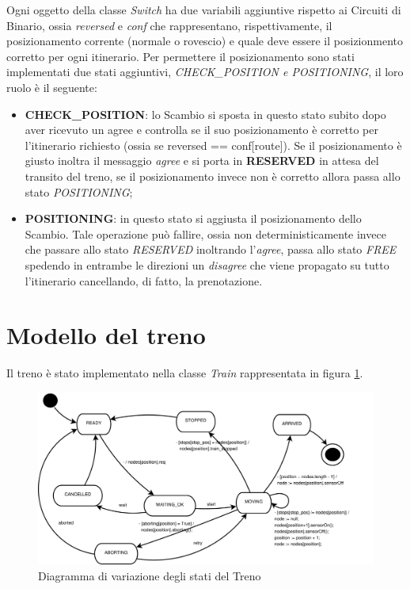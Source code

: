 Ogni oggetto della classe \textit{Switch} ha due variabili aggiuntive rispetto
ai Circuiti di Binario, ossia \textit{reversed} e \textit{conf} che
rappresentano, rispettivamente, il posizionamento corrente (normale o rovescio)
e quale deve essere il posizionmento corretto per ogni itinerario. Per
permettere il posizionamento sono stati implementati due stati aggiuntivi,
\textit{CHECK\_POSITION e POSITIONING}, il loro ruolo è il seguente:
\begin{itemize}
  \item \textbf{CHECK\_POSITION}: lo Scambio si sposta in questo stato subito
  dopo aver ricevuto un agree e controlla se il suo posizionamento è corretto
  per l’itinerario richiesto (ossia se reversed == conf[route]). Se il
  posizionamento è giusto inoltra il messaggio \textit{agree} e si porta in
  \textbf{RESERVED} in attesa del transito del treno, se il posizionamento
  invece non è corretto allora passa allo stato \textit{POSITIONING};
  \item \textbf{POSITIONING}: in questo stato si aggiusta il posizionamento dello
	Scambio. Tale operazione può fallire, ossia non deterministicamente invece che
	passare allo stato \textit{RESERVED} inoltrando l’\textit{agree}, passa allo
	stato \textit{FREE} spedendo in entrambe le direzioni un \textit{disagree} che
	viene propagato su tutto l’itinerario cancellando, di fatto, la prenotazione.
\end{itemize}

\section{Modello del treno}
Il treno è stato implementato nella classe \textit{Train} rappresentata in
figura \ref{fig:Treno}.
\begin{figure}

\centering
\includegraphics[width=24cm]{imgs/Train.pdf}

\caption{Diagramma di variazione degli stati del Treno}\label{fig:Treno}

\end{figure}

